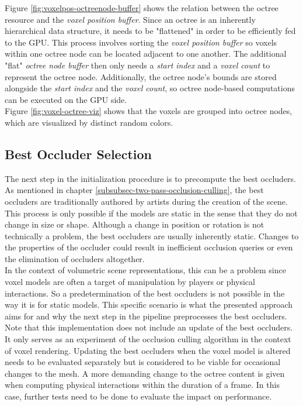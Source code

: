 \noindent
Figure \ref{fig:voxelpos-octreenode-buffer} shows the relation between the octree resource and the \emph{voxel position buffer}.
Since an octree is an inherently hierarchical data structure, it needs to be "flattened" in order to be efficiently fed 
to the \ac{GPU}. This process involves sorting the \emph{voxel position buffer} so voxels within one octree node can be 
located adjacent to one another. The additional "flat" \emph{octree node buffer} then only needs a \emph{start index} 
and a \emph{voxel count} to represent the octree node. Additionally, the octree node's bounds are stored alongside the 
\emph{start index} and the \emph{voxel count}, so octree node-based computations can be executed on the \ac{GPU} side. \\

\noindent
Figure \ref{fig:voxel-octree-viz} shows that the voxels are grouped into octree nodes, which are visualized by distinct 
random colors. 


\subsection*{Best Occluder Selection} \label{subsec-best-occluder-selection}

The next step in the initialization procedure is to precompute the best occluders. As mentioned in chapter 
\ref{subsubsec-two-pass-occlusion-culling}, the best occluders are traditionally authored by artists during the creation 
of the scene. This process is only possible if the models are static in the sense that they do not change in size or 
shape. Although a change in position or rotation is not technically a problem, the best occluders are usually inherently 
static. Changes to the properties of the occluder could result in inefficient occlusion queries or even the elimination 
of occluders altogether. \\

\noindent
In the context of volumetric scene representations, this can be a problem since voxel models are often a target of 
manipulation by players or physical interactions. So a predetermination of the best occluders is not possible in the 
way it is for static models. This specific scenario is what the presented approach aims for and why the next step in 
the pipeline preprocesses the best occluders. \\

\noindent
Note that this implementation does not include an update of the best occluders. It only serves as an experiment of 
the occlusion culling algorithm in the context of voxel rendering. Updating the best occluders when the voxel model 
is altered needs to be evaluated separately but is considered to be viable for occasional changes to the mesh. A 
more demanding change to the octree content is given when computing physical interactions within the duration of a 
frame. In this case, further tests need to be done to evaluate the impact on performance. \\

